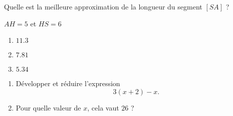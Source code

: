 

\setcounter{exorituel}{0}

\begin{rituel}
    
    Quelle est la meilleure approximation de la longueur du segment \( [SA]\) ?

\begin{center}
    \large
    
\end{center}

\( AH=5\) et \( HS=6\)


\begin{enumerate}
    \item
        \( 11.3\)
    \item
        \( 7.81\)
    \item
        \( 5.34\)
\end{enumerate}
\end{rituel}

\begin{rituel}
    
\begin{enumerate}
    \item
        Développer et réduire l'expression
        \begin{equation}
            3(x+2)-x.
        \end{equation}
    \item
        Pour quelle valeur de \( x\), cela vaut \( 26\) ?
\end{enumerate}

\end{rituel}
